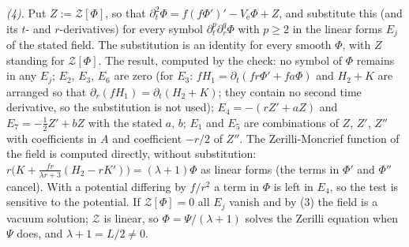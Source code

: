 \emph{(4).} Put $Z := \mathcal{Z}[\Phi]$, so that $\partial_{t}^{2}\Phi = f(f\Phi')' - V_{\mathrm{e}}\Phi + Z$, and substitute this (and its $t$- and $r$-derivatives) for every symbol $\partial_{t}^{p}\partial_{r}^{q}\Phi$ with $p \geq 2$ in the linear forms $E_{j}$ of the stated field. The substitution is an identity for every smooth $\Phi$, with $Z$ standing for $\mathcal{Z}[\Phi]$. The result, computed by the check: no symbol of $\Phi$ remains in any $E_{j}$; $E_{2}$, $E_{3}$, $E_{6}$ are zero (for $E_{3}$: $fH_{1} = \partial_{t}(fr\Phi' + fa\Phi)$ and $H_{2} + K$ are arranged so that $\partial_{r}(fH_{1}) = \partial_{t}(H_{2} + K)$; they contain no second time derivative, so the substitution is not used); $E_{4} = -(rZ' + aZ)$ and $E_{7} = -\tfrac12 Z' + bZ$ with the stated $a$, $b$; $E_{1}$ and $E_{5}$ are combinations of $Z$, $Z'$, $Z''$ with coefficients in $A$ and coefficient $-r/2$ of $Z''$. The Zerilli-Moncrief function of the field is computed directly, without substitution: $r\bigl(K + \tfrac{fr}{\lambda r + 3}(H_{2} - rK')\bigr) = (\lambda + 1)\Phi$ as linear forms (the terms in $\Phi'$ and $\Phi''$ cancel). With a potential differing by $f/r^{2}$ a term in $\Phi$ is left in $E_{4}$, so the test is sensitive to the potential. If $\mathcal{Z}[\Phi] = 0$ all $E_{j}$ vanish and by (3) the field is a vacuum solution; $\mathcal{Z}$ is linear, so $\Phi = \Psi/(\lambda + 1)$ solves the Zerilli equation when $\Psi$ does, and $\lambda + 1 = L/2 \neq 0$.

